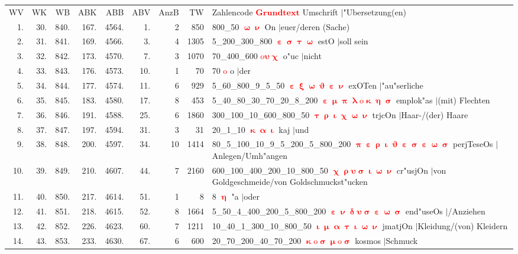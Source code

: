 \documentclass[a4paper,10pt,landscape]{article}
\begin{document}
\begin{tabular}{rrrrrrrrp{120mm}}
WV&WK&WB&ABK&ABB&ABV&AnzB&TW&Zahlencode \textcolor{red}{$\boldsymbol{Grundtext}$} Umschrift $|$"Ubersetzung(en)\\
1.&30.&840.&167.&4564.&1.&2&850&800\_50 \textcolor{red}{$\boldsymbol{\upomega\upnu}$} On $|$euer/deren (Sache)\\
2.&31.&841.&169.&4566.&3.&4&1305&5\_200\_300\_800 \textcolor{red}{$\boldsymbol{\upepsilon\upsigma\uptau\upomega}$} estO $|$soll sein\\
3.&32.&842.&173.&4570.&7.&3&1070&70\_400\_600 \textcolor{red}{$\boldsymbol{\mathrm{o}\upsilon\upchi}$} o"uc $|$nicht\\
4.&33.&843.&176.&4573.&10.&1&70&70 \textcolor{red}{$\boldsymbol{\mathrm{o}}$} o $|$der\\
5.&34.&844.&177.&4574.&11.&6&929&5\_60\_800\_9\_5\_50 \textcolor{red}{$\boldsymbol{\upepsilon\upxi\upomega\upvartheta\upepsilon\upnu}$} exOTen $|$"au"serliche\\
6.&35.&845.&183.&4580.&17.&8&453&5\_40\_80\_30\_70\_20\_8\_200 \textcolor{red}{$\boldsymbol{\upepsilon\upmu\uppi\uplambda\mathrm{o}\upkappa\upeta\upsigma}$} emplok"as $|$(mit) Flechten\\
7.&36.&846.&191.&4588.&25.&6&1860&300\_100\_10\_600\_800\_50 \textcolor{red}{$\boldsymbol{\uptau\uprho\upiota\upchi\upomega\upnu}$} trjcOn $|$Haar-/(der) Haare\\
8.&37.&847.&197.&4594.&31.&3&31&20\_1\_10 \textcolor{red}{$\boldsymbol{\upkappa\upalpha\upiota}$} kaj $|$und\\
9.&38.&848.&200.&4597.&34.&10&1414&80\_5\_100\_10\_9\_5\_200\_5\_800\_200 \textcolor{red}{$\boldsymbol{\uppi\upepsilon\uprho\upiota\upvartheta\upepsilon\upsigma\upepsilon\upomega\upsigma}$} perjTeseOs $|$Anlegen/Umh"angen\\
10.&39.&849.&210.&4607.&44.&7&2160&600\_100\_400\_200\_10\_800\_50 \textcolor{red}{$\boldsymbol{\upchi\uprho\upsilon\upsigma\upiota\upomega\upnu}$} cr"usjOn $|$von Goldgeschmeide/von Goldschmuckst"ucken\\
11.&40.&850.&217.&4614.&51.&1&8&8 \textcolor{red}{$\boldsymbol{\upeta}$} "a $|$oder\\
12.&41.&851.&218.&4615.&52.&8&1664&5\_50\_4\_400\_200\_5\_800\_200 \textcolor{red}{$\boldsymbol{\upepsilon\upnu\updelta\upsilon\upsigma\upepsilon\upomega\upsigma}$} end"useOs $|$/Anziehen\\
13.&42.&852.&226.&4623.&60.&7&1211&10\_40\_1\_300\_10\_800\_50 \textcolor{red}{$\boldsymbol{\upiota\upmu\upalpha\uptau\upiota\upomega\upnu}$} jmatjOn $|$Kleidung/(von) Kleidern\\
14.&43.&853.&233.&4630.&67.&6&600&20\_70\_200\_40\_70\_200 \textcolor{red}{$\boldsymbol{\upkappa\mathrm{o}\upsigma\upmu\mathrm{o}\upsigma}$} kosmos $|$Schmuck\\
\end{tabular}\medskip \\
\end{document}
